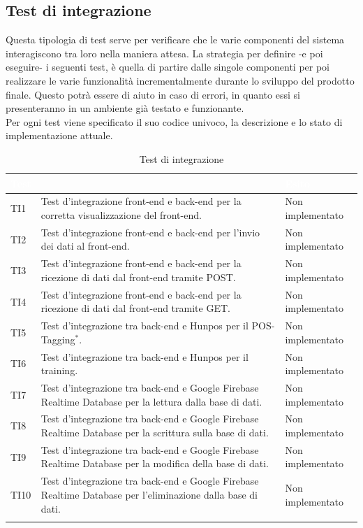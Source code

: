 \subsection{Test di integrazione}
Questa tipologia di test serve per verificare che le varie componenti del sistema interagiscono tra loro nella maniera attesa. La strategia per definire -e poi eseguire- i seguenti test, è quella di partire dalle singole componenti per poi realizzare le varie funzionalità incrementalmente durante lo sviluppo del prodotto finale. Questo potrà essere di aiuto in caso di errori, in quanto essi si presenteranno in un ambiente già testato e funzionante. \\
Per ogni test viene specificato il suo codice univoco, la descrizione e lo stato di implementazione attuale.

	\begin{longtable}{|>{\centering\arraybackslash}m{1.6cm}|>{\centering\arraybackslash}m{6.41cm}|>{\centering\arraybackslash}m{3.1cm}|}		
		\rowcolor{LightBlue}
		\textbf{\textcolor{white}{Test}}
		& \multicolumn{1}{|c|}{\textbf{\textcolor{white}{ Descrizione}}}
		& \textbf{\textcolor{white}{Esito}}\\
		\hline
		TI1
		& Test d’integrazione front-end e back-end per la corretta visualizzazione del front-end.
		& Non implementato
		\\ \hline
		\rowcolor{LightGray}
		TI2
		& Test d’integrazione front-end e back-end per l'invio dei dati al front-end.
		& Non implementato
		\\ \hline
		TI3
		& Test d’integrazione front-end e back-end per la ricezione di dati dal front-end tramite POST.
		& Non implementato
		\\ \hline
		\rowcolor{LightGray}
		TI4
		& Test d’integrazione front-end e back-end per la ricezione di dati dal front-end tramite GET.
		& Non implementato
		\\ \hline
		TI5
		& Test d’integrazione tra back-end e Hunpos per il POS-Tagging$^*$.
		& Non implementato
		\\ \hline
		\rowcolor{LightGray}
		TI6
		& Test d’integrazione tra back-end e Hunpos per il training.
		& Non implementato
		\\ \hline	
		TI7
		& Test d’integrazione tra back-end e Google Firebase Realtime Database per la lettura dalla base di dati.
		& Non implementato
		\\ \hline	
		\rowcolor{LightGray}
		TI8
		& Test d’integrazione tra back-end e Google Firebase Realtime Database per la scrittura sulla base di dati.
		& Non implementato
		\\ \hline	
		TI9
		& Test d’integrazione tra back-end e Google Firebase Realtime Database per la modifica della base di dati.
		& Non implementato
		\\ \hline	
		\rowcolor{LightGray}
		TI10
		& Test d’integrazione tra back-end e Google Firebase Realtime Database per l'eliminazione dalla base di dati.
		& Non implementato
		\\ \hline	
		\caption{Test di integrazione}
\end{longtable}


